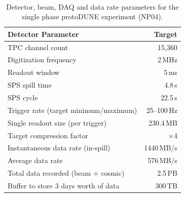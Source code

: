 \documentclass[pdftex,12pt,letter]{article}
\newcommand{\pd}{protoDUNE\xspace}
\begin{document}

\begin{table}
\begin{center}
\caption[GPS Detector Locations]{\label{table:np04_data_rate}
  Detector, beam, DAQ and data rate parameters for the single phase
  \pd experiment (NP04).}
\ \\
\begin{tabularx}{0.75\textwidth}{ X  >{\setlength{\hsize}{0.8\hsize}}r}
\hline
Detector Parameter & Target \\
\hline
TPC channel count & 15,360 \\
Digitization frequency & 2\,MHz \\
Readout window & 5\,ms \\
SPS spill time& 4.8\,s\\
SPS cycle& 22.5\,s\\
Trigger rate (target minimum/maximum) & 25--100\,Hz \\
Single readout size (per trigger) & 230.4\,MB \\
Target compression factor& $\times$4 \\
Instantaneous data rate (in-spill) & 1440\,MB/s \\
Average data rate & 576\,MB/s \\
Total data recorded (beam + cosmic) & 2.5\,PB\\
Buffer to store 3 days worth of data & 300\,TB\\
\hline
\end{tabularx}
\end{center}
\end{table}
\end{document}
